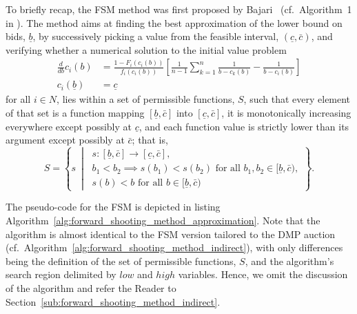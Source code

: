 To briefly recap, the FSM method was first proposed by Bajari~\cite{Bajari2001a} (cf.~Algorithm~1 in \cite{Bajari2001a}). The method aims at finding the best approximation of the lower bound on bids, $\underline{b}$, by successively picking a value from the feasible interval, $(\underline{c}, \bar{c})$, and verifying whether a numerical solution to the initial value problem
\begin{equation}
  \label{eq:fsm_initial_value_problem_approximation}
  \begin{array}{ll}
     \displaystyle\frac{d}{db}c_i(b) &= \displaystyle\frac{1 - F_i(c_i(b))}{f_i(c_i(b))}\left[ \frac{1}{n-1}\sum_{k=1}^n \frac{1}{b-c_k(b)} - \frac{1}{b-c_i(b)} \right]\\[2ex]
    c_i(\underline{b}) &= \underline{c}
  \end{array}
\end{equation}
for all $i\in N$, lies within a set of permissible functions, $S$, such that every element of that set is a function mapping $[\underline{b}, \bar{c}]$ into $[\underline{c}, \bar{c}]$, it is monotonically increasing everywhere except possibly at $\underline{c}$, and each function value is strictly lower than its argument except possibly at $\bar{c}$; that is,
\begin{equation*}
  S=\left\{s \:\middle\vert\:
  \begin{array}{l}
    s: [\underline{b}, \bar{c}]\to [\underline{c}, \bar{c}],\\
    b_1 < b_2\implies s(b_1) < s(b_2) \text{ for all }b_1,b_2\in [\underline{b}, \bar{c}),\\
    s(b) < b \text{ for all }b\in [\underline{b}, \bar{c})
  \end{array}
  \right\}.
\end{equation*}

The pseudo-code for the FSM is depicted in listing Algorithm~\ref{alg:forward_shooting_method_approximation}. Note that the algorithm is almost identical to the FSM version tailored to the DMP auction (cf.~Algorithm~\ref{alg:forward_shooting_method_indirect}), with only differences being the definition of the set of permissible functions, $S$, and the algorithm's search region delimited by $low$ and $high$ variables. Hence, we omit the discussion of the algorithm and refer the Reader to Section~\ref{sub:forward_shooting_method_indirect}.

